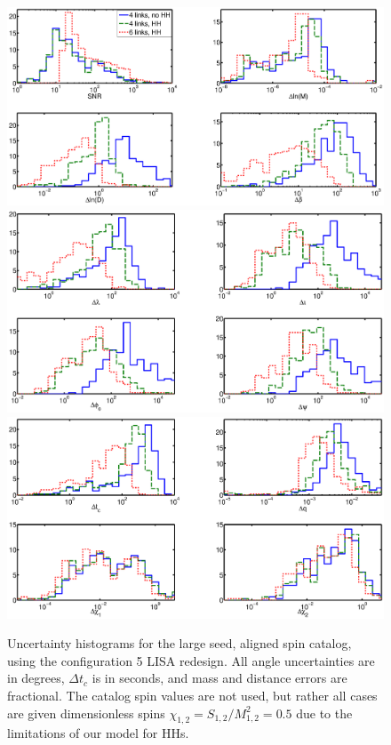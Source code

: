 \documentclass{iopart}
\begin{document}
\begin{figure}
\begin{center}
\includegraphics*[trim = 0mm 0mm 0mm 0mm, clip, scale=.28, angle=0]{FigSean/model_LE_1.eps}
\includegraphics*[trim = 0mm 0mm 0mm 0mm, clip, scale=.28, angle=0]{FigSean/model_LE_2.eps}
\includegraphics*[trim = 0mm 0mm 0mm 0mm, clip, scale=.28, angle=0]{FigSean/model_LE_3.eps}
\caption
{
Uncertainty histograms for the large seed, aligned spin catalog, using the configuration 5 LISA redesign.  All angle uncertainties are in degrees, $\Delta t_c$ is in seconds,
and mass and distance errors are fractional.  The catalog spin values are not used, but rather all cases are given dimensionless
spins $\chi_{1,2}=S_{1,2}/M^2_{1,2}=0.5$ due to the limitations of our model for HHs.
\vspace{10mm}}
\label{fig:LE}
\end{center}
\end{figure}
\end{document}
